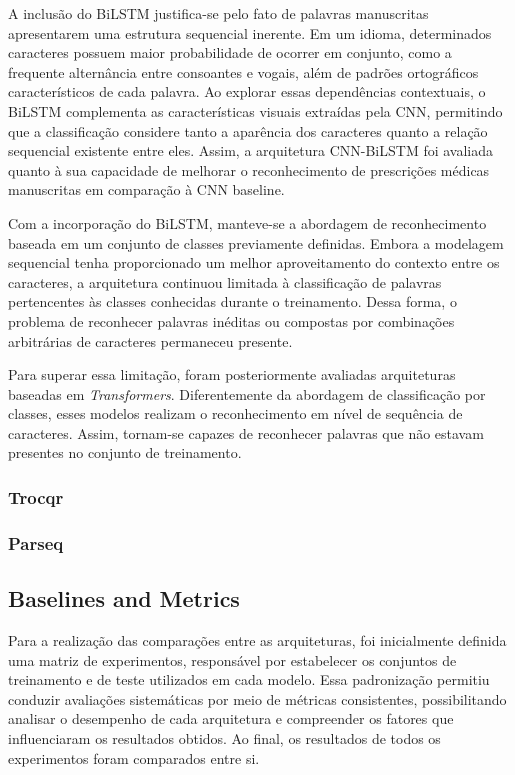 \documentclass[11pt,a4paper]{article}
\begin{document}
A inclusão do BiLSTM justifica-se pelo fato de palavras manuscritas apresentarem uma estrutura sequencial inerente. Em um idioma, determinados caracteres possuem maior probabilidade de ocorrer em conjunto, como a frequente alternância entre consoantes e vogais, além de padrões ortográficos característicos de cada palavra. Ao explorar essas dependências contextuais, o BiLSTM complementa as características visuais extraídas pela CNN, permitindo que a classificação considere tanto a aparência dos caracteres quanto a relação sequencial existente entre eles. Assim, a arquitetura CNN-BiLSTM foi avaliada quanto à sua capacidade de melhorar o reconhecimento de prescrições médicas manuscritas em comparação à CNN baseline.

Com a incorporação do BiLSTM, manteve-se a abordagem de reconhecimento baseada em um conjunto de classes previamente definidas. Embora a modelagem sequencial tenha proporcionado um melhor aproveitamento do contexto entre os caracteres, a arquitetura continuou limitada à classificação de palavras pertencentes às classes conhecidas durante o treinamento. Dessa forma, o problema de reconhecer palavras inéditas ou compostas por combinações arbitrárias de caracteres permaneceu presente.

Para superar essa limitação, foram posteriormente avaliadas arquiteturas baseadas em \textit{Transformers}. Diferentemente da abordagem de classificação por classes, esses modelos realizam o reconhecimento em nível de sequência de caracteres. Assim, tornam-se capazes de reconhecer palavras que não estavam presentes no conjunto de treinamento.


\subsubsection{Trocqr}
\subsubsection{Parseq}
\subsection{Baselines and Metrics}
\label{sec:baselines}

Para a realização das comparações entre as arquiteturas, foi inicialmente definida uma matriz de experimentos, responsável por estabelecer os conjuntos de treinamento e de teste utilizados em cada modelo. Essa padronização permitiu conduzir avaliações sistemáticas por meio de métricas consistentes, possibilitando analisar o desempenho de cada arquitetura e compreender os fatores que influenciaram os resultados obtidos. Ao final, os resultados de todos os experimentos foram comparados entre si.
\end{document}
